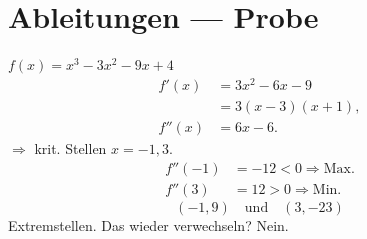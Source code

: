 \documentclass{article}
\begin{document}
\section{Ableitungen --- Probe}
$f(x)=x^3-3x^2-9x+4$
\begin{align*}
f'(x)&=3x^2-6x-9\\
&=3(x-3)(x+1),\\
f''(x)&=6x-6.
\end{align*}
$\Rightarrow$ krit. Stellen $x=-1,3$.
\begin{align*}
f''(-1)&=-12<0\Rightarrow\text{Max.}\\
f''(3)&=12>0\Rightarrow\text{Min.}
\end{align*}
\[
\boxed{(-1,9)\quad\text{und}\quad(3,-23)}
\]
 Extremstellen. Das wieder verwechseln? Nein.
\end{document}
